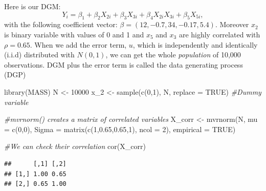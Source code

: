 \documentclass[
]{book}
\newenvironment{Shaded}{\begin{snugshade}}{\end{snugshade}}
\newcommand{\AttributeTok}[1]{\textcolor[rgb]{0.77,0.63,0.00}{#1}}
\newcommand{\CommentTok}[1]{\textcolor[rgb]{0.56,0.35,0.01}{\textit{#1}}}
\newcommand{\ConstantTok}[1]{\textcolor[rgb]{0.00,0.00,0.00}{#1}}
\newcommand{\DecValTok}[1]{\textcolor[rgb]{0.00,0.00,0.81}{#1}}
\newcommand{\FloatTok}[1]{\textcolor[rgb]{0.00,0.00,0.81}{#1}}
\newcommand{\FunctionTok}[1]{\textcolor[rgb]{0.00,0.00,0.00}{#1}}
\newcommand{\NormalTok}[1]{#1}
\newcommand{\OtherTok}[1]{\textcolor[rgb]{0.56,0.35,0.01}{#1}}
\theoremstyle{definition}
\theoremstyle{definition}
\theoremstyle{definition}
\theoremstyle{definition}
\theoremstyle{remark}
\begin{document}
Here is our DGM:\\
\[
Y_{i}=\beta_{1}+\beta_{2} X_{2 i}+\beta_{3} X_{3 i}+\beta_{4} X_{2 i} X_{3 i}+\beta_{5} X_{5 i},
\]
with the following coefficient vector: \(\beta = (12, -0.7, 34, -0.17, 5.4)\). Moreover \(x_2\) is binary variable with values of 0 and 1 and \(x_5\) and \(x_3\) are highly correlated with \(\rho = 0.65\). When we add the error term, \(u\), which is independently and identically (i.i.d) distributed with \(N(0,1)\), we can get the whole \emph{population} of 10,000 observations. DGM plus the error term is called the data generating process (DGP)

\begin{Shaded}
\begin{Highlighting}[]
\FunctionTok{library}\NormalTok{(MASS)}
\NormalTok{N }\OtherTok{\textless{}{-}} \DecValTok{10000}
\NormalTok{x\_2 }\OtherTok{\textless{}{-}} \FunctionTok{sample}\NormalTok{(}\FunctionTok{c}\NormalTok{(}\DecValTok{0}\NormalTok{,}\DecValTok{1}\NormalTok{), N, }\AttributeTok{replace =} \ConstantTok{TRUE}\NormalTok{) }\CommentTok{\#Dummy variable}

\CommentTok{\#mvrnorm() creates a matrix of correlated variables }
\NormalTok{X\_corr }\OtherTok{\textless{}{-}} \FunctionTok{mvrnorm}\NormalTok{(N, }\AttributeTok{mu =} \FunctionTok{c}\NormalTok{(}\DecValTok{0}\NormalTok{,}\DecValTok{0}\NormalTok{), }\AttributeTok{Sigma =} \FunctionTok{matrix}\NormalTok{(}\FunctionTok{c}\NormalTok{(}\DecValTok{1}\NormalTok{,}\FloatTok{0.65}\NormalTok{,}\FloatTok{0.65}\NormalTok{,}\DecValTok{1}\NormalTok{), }\AttributeTok{ncol =} \DecValTok{2}\NormalTok{),}
               \AttributeTok{empirical =} \ConstantTok{TRUE}\NormalTok{)}

\CommentTok{\#We can check their correlation}
\FunctionTok{cor}\NormalTok{(X\_corr)}
\end{Highlighting}
\end{Shaded}

\begin{verbatim}
##      [,1] [,2]
## [1,] 1.00 0.65
## [2,] 0.65 1.00
\end{verbatim}
\end{document}
